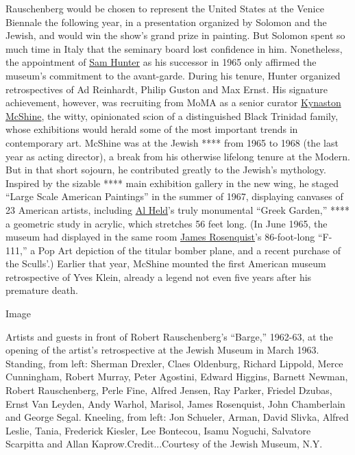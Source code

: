 Rauschenberg would be chosen to represent the United States at the
Venice Biennale the following year, in a presentation organized by
Solomon and the Jewish, and would win the show's grand prize in
painting. But Solomon spent so much time in Italy that the seminary
board lost confidence in him. Nonetheless, the appointment of
\href{https://www.nytimes.com/2014/08/26/arts/sam-hunter-curator-and-museum-founder-dies-at-91.html}{Sam
Hunter} as his successor in 1965 only affirmed the museum's commitment
to the avant-garde. During his tenure, Hunter organized retrospectives
of Ad Reinhardt, Philip Guston and Max Ernst. His signature achievement,
however, was recruiting from MoMA as a senior curator
\href{https://stories.thejewishmuseum.org/the-jewish-museum-remembers-kynaston-mcshine-1d6741c02815}{Kynaston
McShine}, the witty, opinionated scion of a distinguished Black Trinidad
family, whose exhibitions would herald some of the most important trends
in contemporary art. McShine was at the Jewish **** from 1965 to 1968
(the last year as acting director), a break from his otherwise lifelong
tenure at the Modern. But in that short sojourn, he contributed greatly
to the Jewish's mythology. Inspired by the sizable **** main exhibition
gallery in the new wing, he staged ``Large Scale American Paintings'' in
the summer of 1967, displaying canvases of 23 American artists,
including
\href{https://www.nytimes.com/2016/05/02/t-magazine/art/al-held-brushstroke-drawings.html}{Al
Held}'s truly monumental ``Greek Garden,'' **** a geometric study in
acrylic, which stretches 56 feet long. (In June 1965, the museum had
displayed in the same room
\href{https://www.nytimes.com/2016/03/18/arts/design/james-rosenquist-and-erro-discuss-a-long-friendship-forged-in-pop-art.html}{James
Rosenquist}'s 86-foot-long ``F-111,'' a Pop Art depiction of the titular
bomber plane, and a recent purchase of the Sculls'.) Earlier that year,
McShine mounted the first American museum retrospective of Yves Klein,
already a legend not even five years after his premature death.

Image

Artists and guests in front of Robert Rauschenberg's ``Barge,'' 1962-63,
at the opening of the artist's retrospective at the Jewish Museum in
March 1963. Standing, from left: Sherman Drexler, Claes Oldenburg,
Richard Lippold, Merce Cunningham, Robert Murray, Peter Agostini, Edward
Higgins, Barnett Newman, Robert Rauschenberg, Perle Fine, Alfred Jensen,
Ray Parker, Friedel Dzubas, Ernst Van Leyden, Andy Warhol, Marisol,
James Rosenquist, John Chamberlain and George Segal. Kneeling, from
left: Jon Schueler, Arman, David Slivka, Alfred Leslie, Tania, Frederick
Kiesler, Lee Bontecou, Isamu Noguchi, Salvatore Scarpitta and Allan
Kaprow.Credit...Courtesy of the Jewish Museum, N.Y.

